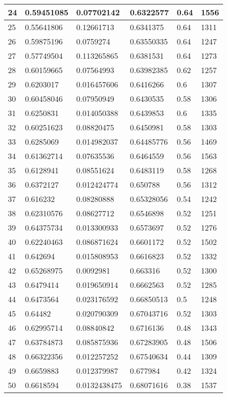 \begin{longtable}{|l|l|l|l|l|l|}
24 & 0.59451085 & 0.07702142 & 0.6322577 & 0.64 & 1556 \\ \hline 
25 & 0.55641806 & 0.12661713 & 0.6341375 & 0.64 & 1311 \\ \hline 
26 & 0.59875196 & 0.0759274 & 0.63550335 & 0.64 & 1247 \\ \hline 
27 & 0.57749504 & 0.113265865 & 0.6381531 & 0.64 & 1273 \\ \hline 
28 & 0.60159665 & 0.07564993 & 0.63982385 & 0.62 & 1257 \\ \hline 
29 & 0.6203017 & 0.016457606 & 0.6416266 & 0.6 & 1307 \\ \hline 
30 & 0.60458046 & 0.07950949 & 0.6430535 & 0.58 & 1306 \\ \hline 
31 & 0.6250831 & 0.014050388 & 0.6439853 & 0.6 & 1335 \\ \hline 
32 & 0.60251623 & 0.08820475 & 0.6450981 & 0.58 & 1303 \\ \hline 
33 & 0.6285069 & 0.014982037 & 0.64485776 & 0.56 & 1469 \\ \hline 
34 & 0.61362714 & 0.07635536 & 0.6464559 & 0.56 & 1563 \\ \hline 
35 & 0.6128941 & 0.08551624 & 0.6483119 & 0.58 & 1268 \\ \hline 
36 & 0.6372127 & 0.012424774 & 0.650788 & 0.56 & 1312 \\ \hline 
37 & 0.616232 & 0.08280888 & 0.65328056 & 0.54 & 1242 \\ \hline 
38 & 0.62310576 & 0.08627712 & 0.6546898 & 0.52 & 1251 \\ \hline 
39 & 0.64375734 & 0.013300933 & 0.6573697 & 0.52 & 1276 \\ \hline 
40 & 0.62240463 & 0.086871624 & 0.6601172 & 0.52 & 1502 \\ \hline 
41 & 0.642694 & 0.015808953 & 0.6616823 & 0.52 & 1332 \\ \hline 
42 & 0.65268975 & 0.0092981 & 0.663316 & 0.52 & 1300 \\ \hline 
43 & 0.6479414 & 0.019650914 & 0.6662563 & 0.52 & 1285 \\ \hline 
44 & 0.6473564 & 0.023176592 & 0.66850513 & 0.5 & 1248 \\ \hline 
45 & 0.64482 & 0.020790309 & 0.67043716 & 0.52 & 1303 \\ \hline 
46 & 0.62995714 & 0.08840842 & 0.6716136 & 0.48 & 1343 \\ \hline 
47 & 0.63784873 & 0.085875936 & 0.67283905 & 0.48 & 1506 \\ \hline 
48 & 0.66322356 & 0.012257252 & 0.67540634 & 0.44 & 1309 \\ \hline 
49 & 0.6659883 & 0.012379987 & 0.677984 & 0.42 & 1324 \\ \hline 
50 & 0.6618594 & 0.0132438475 & 0.68071616 & 0.38 & 1537 \\ \hline 
\end{longtable}